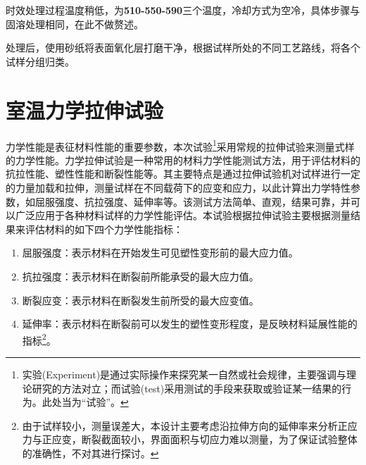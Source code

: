 时效处理过程温度稍低，为\textbf{510-550-590}三个温度，冷却方式为空冷，具体步骤与固溶处理相同，在此不做赘述。

处理后，使用砂纸将表面氧化层打磨干净，根据试样所处的不同工艺路线，将各个试样分组归类。


\section{室温力学拉伸试验}
力学性能是表征材料性能的重要参数，本次试验\footnote{实验(Experiment)是通过实际操作来探究某一自然或社会规律，主要强调与理论研究的方法对立；而试验(test)采用测试的手段来获取或验证某一结果的行为。此处当为“试验”。}采用常规的拉伸试验来测量式样的力学性能。力学拉伸试验是一种常用的材料力学性能测试方法，用于评估材料的抗拉性能、塑性性能和断裂性能等。其主要特点是通过拉伸试验机对试样进行一定的力量加载和拉伸，测量试样在不同载荷下的应变和应力，以此计算出力学特性参数，如屈服强度、抗拉强度、延伸率等。该测试方法简单、直观，结果可靠，并可以广泛应用于各种材料试样的力学性能评估。本试验根据拉伸试验主要根据测量结果来评估材料的如下四个力学性能指标：
\begin{enumerate}
	\item 屈服强度：表示材料在开始发生可见塑性变形前的最大应力值。
	\item 抗拉强度：表示材料在断裂前所能承受的最大应力值。
	\item 断裂应变：表示材料在断裂发生前所受的最大应变值。
	\item 延伸率：表示材料在断裂前可以发生的塑性变形程度，是反映材料延展性能的指标\footnote{由于试样较小，测量误差大，本设计主要考虑沿拉伸方向的延伸率来分析正应力与正应变，断裂截面较小，界面面积与切应力难以测量，为了保证试验整体的准确性，不对其进行探讨。}。
\end{enumerate}

